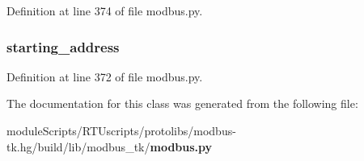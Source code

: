 Definition at line 374 of file modbus.\+py.

\subsubsection[{starting\+\_\+address}]{\setlength{\rightskip}{0pt plus 5cm}starting\+\_\+address}\label{classmodbus__tk_1_1modbus_1_1_modbus_block_a7c88eba1f515bdd4530d5f5c376bc347}


Definition at line 372 of file modbus.\+py.



The documentation for this class was generated from the following file\+:\begin{DoxyCompactItemize}
\item 
module\+Scripts/\+R\+T\+Uscripts/protolibs/modbus-\/tk.\+hg/build/lib/modbus\+\_\+tk/{\bf modbus.\+py}\end{DoxyCompactItemize}
